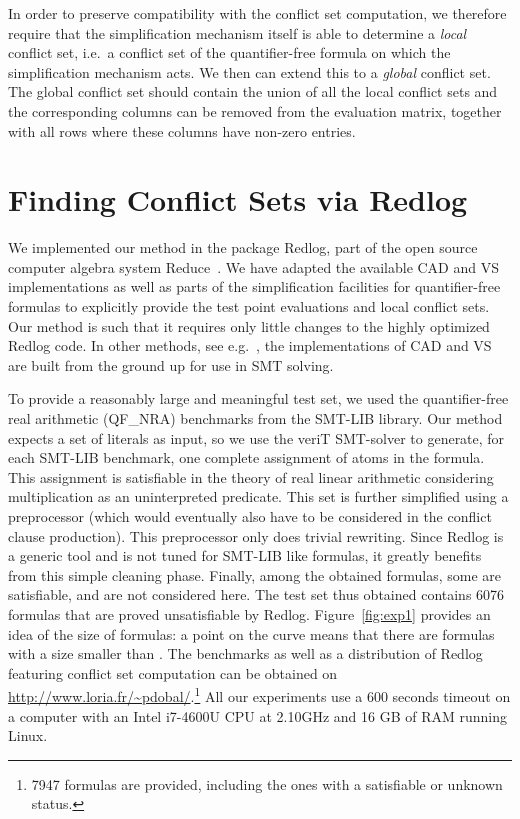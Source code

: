 \documentclass{llncs}
\begin{document}
In order to preserve compatibility with the conflict set computation, we
therefore require that the simplification mechanism itself is able to determine
a \textit{local} conflict set, i.e.\ a conflict set of the quantifier-free
formula on which the simplification mechanism acts. We then can extend this to a
\textit{global} conflict set. The global conflict set should contain the union
of all the local conflict sets and the corresponding columns can be removed from
the evaluation matrix, together with all rows where these columns have non-zero
entries.

\section{Finding Conflict Sets via Redlog}
\label{sec:exp}

We implemented our method in the package Redlog, part of the open source
computer algebra system Reduce~\cite{reduce}.  We have adapted the available CAD
and VS implementations as well as parts of the simplification facilities for
quantifier-free formulas to explicitly provide the test point evaluations and
local conflict sets. Our method is such that it requires only little changes to
the highly optimized Redlog code. In other methods, see e.g.~\cite{smtrat}, the
implementations of CAD and VS are built from the ground up for use in SMT
solving.

To provide a reasonably large and meaningful test set, we used the
quantifier-free real arithmetic (QF\_NRA) benchmarks from the SMT-LIB library.
Our method expects a set of literals as input, so we use the veriT SMT-solver to
generate, for each SMT-LIB benchmark, one complete assignment of atoms in the
formula.  This assignment is satisfiable in the theory of real linear arithmetic
considering multiplication as an uninterpreted predicate.  This set is further
simplified using a preprocessor (which would eventually also have to be
considered in the conflict clause production).  This preprocessor only does
trivial rewriting.  Since Redlog is a generic tool and is not tuned for SMT-LIB
like formulas, it greatly benefits from this simple cleaning phase.  Finally,
among the obtained formulas, some are satisfiable, and are not considered here.
The test set thus obtained contains 6076 formulas that are proved unsatisfiable
by Redlog.  Figure~\ref{fig:exp1} provides an idea of the size of formulas: a
point  on the curve means that there are  formulas with a size
smaller than .  The benchmarks as well as a distribution of Redlog featuring
conflict set computation can be obtained on
\url{http://www.loria.fr/~pdobal/}.\footnote{7947 formulas are provided,
  including the ones with a satisfiable or unknown status.}  All our experiments
use a 600 seconds timeout on a computer with an Intel i7-4600U CPU at
2.10GHz and 16 GB of RAM running Linux.
\end{document}

